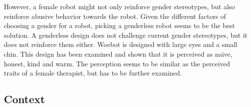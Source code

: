However, a female robot might not only reinforce gender stereotypes, but also reinforce abusive behavior towards the robot\cite{nomura-robot}. 
Given the different factors of choosing a gender for a robot, picking a genderless robot seems to be the best solution.
A genderless design does not challenge current gender stereotypes, but it does not reinforce them either.
Woebot is designed with large eyes and a small chin.
This design has been examined and shown that it is perceived as naive, honest, kind and warm\cite{robot-design}.
The perception seems to be similar as the perceived traits of a female therapist, but has to be further examined.






\subsection{Context}


